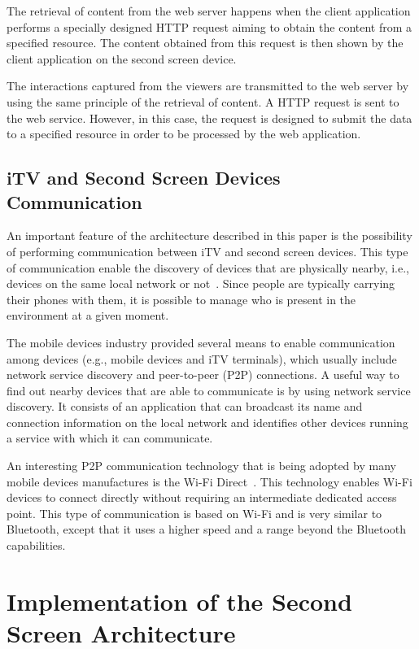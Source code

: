 \documentclass[journal]{IEEEtran}
\begin{document}
The retrieval of content from the web server happens when the client application performs a specially designed HTTP request aiming to obtain the content from a specified resource. The content obtained from this request is then shown by the client application on the second screen device.

The interactions captured from the viewers are transmitted to the web server by using the same principle of the retrieval of content. A HTTP request is sent to the web service. However, in this case, the request is designed to submit the data to a specified resource in order to be processed by the web application.

\subsection{iTV and Second Screen Devices Communication}

An important feature of the architecture described in this paper is the possibility of performing communication between iTV and second screen devices. This type of communication enable the discovery of devices that are physically nearby, i.e., devices on the same local network or not~\cite{Hellman2013}. Since people are typically carrying their phones with them, it is possible to manage who is present in the environment at a given moment.

The mobile devices industry provided several means to enable communication among devices (e.g., mobile devices and iTV terminals), which usually include network service discovery and peer-to-peer (P2P) connections. A useful way to find out nearby devices that are able to communicate is by using network service discovery. It consists of an application that can broadcast its name and connection information on the local network and identifies other devices running a service with which it can communicate.

An interesting P2P communication technology that is being adopted by many mobile devices manufactures is the Wi-Fi Direct~\cite{Hellman2013}. This technology enables Wi-Fi devices to connect directly without requiring an intermediate dedicated access point. This type of communication is based on Wi-Fi and is very similar to Bluetooth, except that it uses a higher speed and a range beyond the Bluetooth capabilities.


\section{Implementation of the Second Screen Architecture}
\label{sec_implementation}
\end{document}
